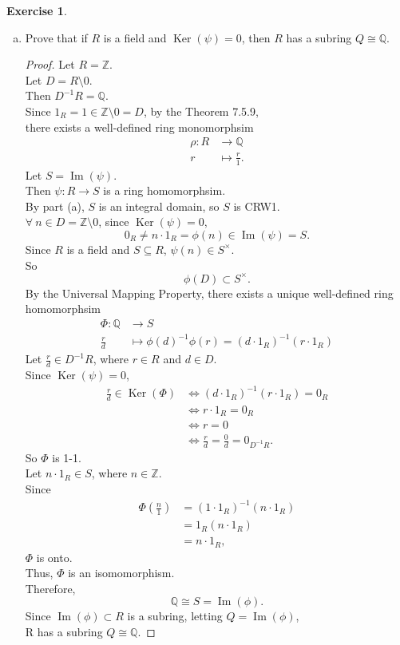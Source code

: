 \documentclass{article}
\newcommand{\bbz}{\mathbb{Z}}
\newcommand{\bbq}{\mathbb{Q}}
\renewcommand{\ker}{\operatorname{Ker}}
\newcommand{\im}{\operatorname{Im}}
\theoremstyle{plain}
\theoremstyle{definition}
\newtheorem{exer}[lem]{Exercise}
\begin{document}
\begin{exer}
\begin{enumerate}[(a)]
\item Prove that if $R$ is a field and $\ker(\psi)=0$, then $R$ has a subring $Q\cong\bbq$.
    \begin{proof}
    Let $R = \bbz$.\\
    Let $D = R \setminus 0$.\\
    Then $D^{-1}R = \bbq$.\\
    Since $1_R = 1 \in \bbz \setminus 0 =D$, by the Theorem 7.5.9,\\
    there exists a well-defined ring monomorphsim 
    \begin{align*}
        \rho:R &\to \bbq \\
             r &\mapsto \frac{r}{1}.
    \end{align*}
    Let $S = \im(\psi)$.\\
    Then $\psi:R\to S$ is a ring homomorphsim.\\
    By part (a), $S$ is an integral domain, so $S$ is CRW1.\\
    $\forall \ n\in D = \bbz \setminus 0$, since $\ker(\psi) = 0$,
    \[ 0_R \neq n \cdot 1_R = \phi(n) \in \im(\psi) = S.\]
    Since $R$ is a field and $S \subseteq R$, $\psi(n) \in S^{\times}$.\\ 
    So 
    \[\phi(D) \subset S^{\times}.\]
    By the Universal Mapping Property, there exists a unique well-defined ring homomorphsim 
    \begin{align*}
    \Phi: \bbq &\to S\\
    \frac{r}{d} &\mapsto {\phi(d)}^{-1}\phi(r) = (d\cdot 1_R)^{-1}(r \cdot 1_R)
    \end{align*}
   Let $\frac{r}{d} \in D^{-1}R$, where $r \in R$ and $d\in D$. \\
   Since $\ker(\psi) = 0$,
   \begin{align*}
       \frac{r}{d} \in \ker(\Phi)&\Longleftrightarrow (d\cdot 1_R)^{-1}(r\cdot 1_R) = 0_R \\
       &\Longleftrightarrow r\cdot 1_R = 0_R \\
       &\Longleftrightarrow r = 0\\
       &\Longleftrightarrow \frac{r}{d} = \frac{0}{d} = 0_{D^{-1}R}.
   \end{align*}
   So $\Phi$ is 1-1.\\
   Let $n\cdot 1_R \in S$, where $n \in \bbz$.\\
   Since 
   \begin{align*}
       \Phi\left(\frac{n}{1}\right) &= (1\cdot 1_R)^{-1}(n\cdot 1_R)\\
       &= 1_R (n\cdot 1_R)\\
       &=n\cdot 1_R, 
   \end{align*}
   $\Phi$ is onto.\\
   Thus, $\Phi$ is an isomomorphism.\\
   Therefore, \[ \bbq \cong S = \im(\phi).\]
   Since $\im(\phi) \subset R$ is a subring, letting $Q = \im(\phi)$,\\
   R has a subring $Q \cong \bbq$.


\end{proof}
\end{enumerate}
\end{exer}
\end{document}

